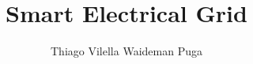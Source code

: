 \documentclass{article}
\begin{document}
%
\title{Smart Electrical Grid}

\author{Thiago Vilella Waideman Puga}






\maketitle 
\end{document}
